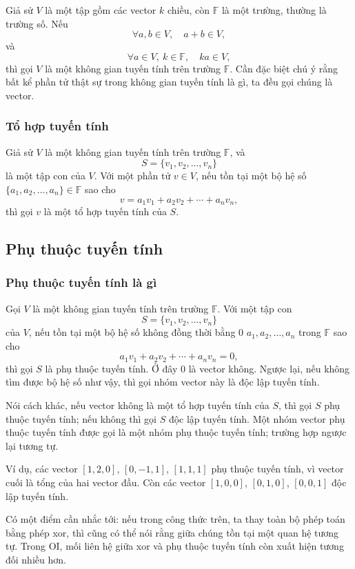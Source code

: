 \documentclass[11pt]{article}
\begin{document}
Giả sử \(V\) là một tập gồm các vector \(k\) chiều, còn \(\mathbb{F}\) là một
trường, thường là trường số. Nếu
\[
  \forall a,b\in V,\quad a+b\in V,
\]
và
\[
  \forall a\in V,\ k\in\mathbb{F},\quad ka\in V,
\]
thì gọi \(V\) là một không gian tuyến tính trên trường \(\mathbb{F}\). Cần đặc
biệt chú ý rằng bất kể phần tử thật sự trong không gian tuyến tính là gì, ta đều
gọi chúng là vector.

\subsubsection{Tổ hợp tuyến tính}

Giả sử \(V\) là một không gian tuyến tính trên trường \(\mathbb{F}\), và
\[
  S=\{v_1,v_2,\ldots,v_n\}
\]
là một tập con của \(V\). Với một phần tử \(v\in V\), nếu tồn tại một bộ hệ số
\(\{a_1,a_2,\ldots,a_n\}\in\mathbb{F}\) sao cho
\[
  v=a_1v_1+a_2v_2+\cdots+a_nv_n,
\]
thì gọi \(v\) là một tổ hợp tuyến tính của \(S\).

\subsection{Phụ thuộc tuyến tính}

\subsubsection{Phụ thuộc tuyến tính là gì}

Gọi \(V\) là một không gian tuyến tính trên trường \(\mathbb{F}\). Với một tập
con
\[
  S=\{v_1,v_2,\ldots,v_n\}
\]
của \(V\), nếu tồn tại một bộ hệ số không đồng thời bằng \(0\)
\(a_1,a_2,\ldots,a_n\) trong \(\mathbb{F}\) sao cho
\[
  a_1v_1+a_2v_2+\cdots+a_nv_n=0,
\]
thì gọi \(S\) là phụ thuộc tuyến tính. Ở đây \(0\) là vector không. Ngược lại,
nếu không tìm được bộ hệ số như vậy, thì gọi nhóm vector này là độc lập tuyến
tính.

Nói cách khác, nếu vector không là một tổ hợp tuyến tính của \(S\), thì gọi \(S\)
phụ thuộc tuyến tính; nếu không thì gọi \(S\) độc lập tuyến tính. Một nhóm
vector phụ thuộc tuyến tính được gọi là một nhóm phụ thuộc tuyến tính; trường hợp
ngược lại tương tự.

Ví dụ, các vector \([1,2,0]\), \([0,-1,1]\), \([1,1,1]\) phụ thuộc tuyến tính,
vì vector cuối là tổng của hai vector đầu. Còn các vector \([1,0,0]\),
\([0,1,0]\), \([0,0,1]\) độc lập tuyến tính.

Có một điểm cần nhắc tới: nếu trong công thức trên, ta thay toàn bộ phép toán
bằng phép xor, thì cũng có thể nói rằng giữa chúng tồn tại một quan hệ tương tự.
Trong OI, mối liên hệ giữa xor và phụ thuộc tuyến tính còn xuất hiện tương đối
nhiều hơn.
\end{document}
